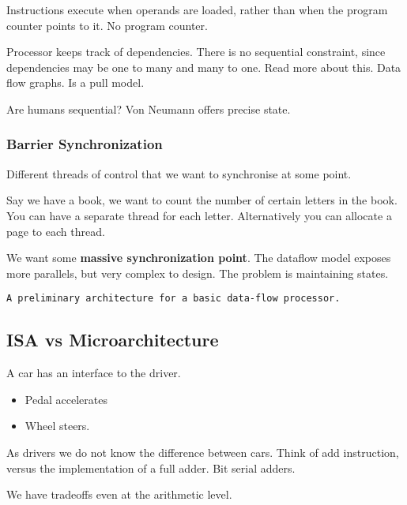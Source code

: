 \documentclass[11pt]{article}
\begin{document}
Instructions execute when operands are loaded, rather than when
the program counter points to it. No program counter.

Processor keeps track of dependencies. There is no sequential
constraint, since dependencies may be one to many and many to
one. Read more about this. Data flow graphs. Is a pull model.

Are humans sequential? Von Neumann offers precise state.

\subsubsection{Barrier Synchronization}
\label{sec:orgheadline4}

Different threads of control that we want to synchronise at
some point.

Say we have a book, we want to count the number of certain
letters in the book. You can have a separate thread for each
letter. Alternatively you can allocate a page to each thread.

We want some \textbf{massive synchronization point}. The dataflow 
model exposes more parallels, but very complex to design.
The problem is maintaining states.

\texttt{A preliminary architecture for a basic data-flow processor.}

\subsection{ISA vs Microarchitecture}
\label{sec:orgheadline6}

A car has an interface to the driver.
\begin{itemize}
\item Pedal accelerates
\item Wheel steers.
\end{itemize}

As drivers we do not know the difference between cars. Think
of add instruction, versus the implementation of a full adder.
Bit serial adders.

We have tradeoffs even at the arithmetic level.
\end{document}
